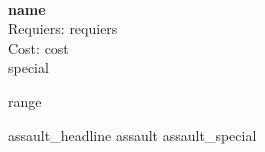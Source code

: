 \ \\
{{\bf {name} }} \\

Requiers: {requiers} \\
Cost: {cost} \\
{special}

{range}

{assault_headline}
{assault}
{assault_special}
